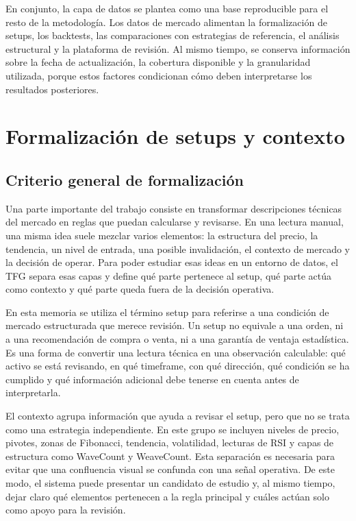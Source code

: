 En conjunto, la capa de datos se plantea como una base reproducible para el
resto de la metodolog\'ia. Los datos de mercado alimentan la formalizaci\'on de
setups, los backtests, las comparaciones con estrategias de referencia, el
an\'alisis estructural y la plataforma de revisi\'on. Al mismo tiempo, se conserva
informaci\'on sobre la fecha de actualizaci\'on, la cobertura disponible y la
granularidad utilizada, porque estos factores condicionan c\'omo deben
interpretarse los resultados posteriores.

\section{Formalizaci\'on de setups y contexto}
\label{sec:formalizacion-setups-contexto}

\subsection{Criterio general de formalizaci\'on}
\label{subsec:criterio-formalizacion-setups}

Una parte importante del trabajo consiste en transformar descripciones
t\'ecnicas del mercado en reglas que puedan calcularse y revisarse. En una
lectura manual, una misma idea suele mezclar varios elementos: la estructura
del precio, la tendencia, un nivel de entrada, una posible invalidaci\'on, el
contexto de mercado y la decisi\'on de operar. Para poder estudiar esas ideas en
un entorno de datos, el TFG separa esas capas y define qu\'e parte pertenece al
setup, qu\'e parte act\'ua como contexto y qu\'e parte queda fuera de la decisi\'on
operativa.

En esta memoria se utiliza el t\'ermino setup para referirse a una condici\'on de
mercado estructurada que merece revisi\'on. Un setup no equivale a una orden, ni
a una recomendaci\'on de compra o venta, ni a una garant\'ia de ventaja
estad\'istica. Es una forma de convertir una lectura t\'ecnica en una observaci\'on
calculable: qu\'e activo se est\'a revisando, en qu\'e timeframe, con qu\'e
direcci\'on, qu\'e condici\'on se ha cumplido y qu\'e informaci\'on adicional debe
tenerse en cuenta antes de interpretarla.

El contexto agrupa informaci\'on que ayuda a revisar el setup, pero que no se
trata como una estrategia independiente. En este grupo se incluyen niveles de
precio, pivotes, zonas de Fibonacci, tendencia, volatilidad, lecturas de RSI y
capas de estructura como WaveCount y WeaveCount. Esta separaci\'on es necesaria
para evitar que una confluencia visual se confunda con una se\~nal operativa.
De este modo, el sistema puede presentar un candidato de estudio y, al mismo
tiempo, dejar claro qu\'e elementos pertenecen a la regla principal y cu\'ales
act\'uan solo como apoyo para la revisi\'on.

